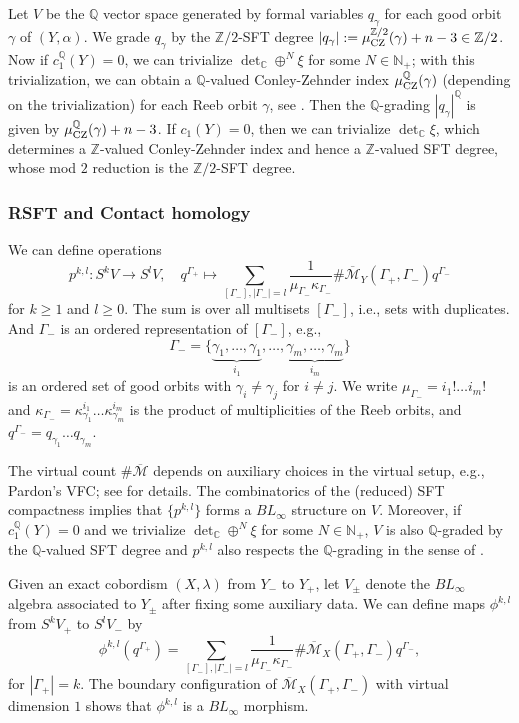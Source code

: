 \documentclass[11pt]{amsart}
\numberwithin{equation}{section}
\def\N{{\mathbb N}}
\def\Z{{\mathbb Z}}
\def\C{{\mathbb C}}
\def\Q{{\mathbb Q}}
\def\cM{{\mathcal M}}
\def\CZ{\rm CZ}
\begin{document}
Let $V$ be the $\Q$ vector space generated by formal variables $q_\gamma$ for each good orbit $\gamma$ of $(Y,\alpha)$. We grade $q_\gamma$ by the $\Z/2$-SFT degree $|q_{\gamma}|:=\mu^{\Z/2}_{\CZ}(\gamma)+n-3\in \Z/2$. Now if $c^{\Q}_1(Y)=0$, we can trivialize $\det_{\C}\oplus^N \xi$ for some $N\in \N_+$; with this trivialization, we can obtain a $\Q$-valued Conley-Zehnder index $\mu^{\Q}_{\CZ}(\gamma)$ (depending on the trivialization) for each Reeb orbit $\gamma$, see \cite[\S 3.3.2]{arXiv:2108.12247}. Then the $\Q$-grading $|q_{\gamma}|^{\Q}$ is given by $\mu^{\Q}_{\CZ}(\gamma)+n-3$. If $c_1(Y)=0$, then we can trivialize $\det_{\C}\xi$, which determines a $\Z$-valued Conley-Zehnder index and hence a $\Z$-valued SFT degree, whose mod $2$ reduction is the $\Z/2$-SFT degree.


\subsubsection{RSFT and Contact homology}
We can define operations 
$$p^{k,l}:S^kV \to S^lV, \quad q^{\Gamma_+} \mapsto \sum_{[\Gamma_-],|\Gamma_-|=l} \frac{1}{\mu_{\Gamma_-}\kappa_{\Gamma_-}}\#\overline{\cM}_Y(\Gamma_+,\Gamma_-)q^{\Gamma_-}$$
for $k\ge 1$ and $l\ge 0$.
The sum is over all multisets $[\Gamma_-]$, i.e., sets with duplicates. And $\Gamma_-$ is an ordered representation of $[\Gamma_-]$, e.g., $$\Gamma_-=\{\underbrace{\gamma_1,\ldots,\gamma_1}_{i_1}, \ldots, \underbrace{\gamma_m,\ldots,\gamma_m}_{i_m}\}$$ is an ordered set of good orbits with $\gamma_i\ne \gamma_j$ for $i\ne j$. We write $\mu_{\Gamma_-}=i_1!\ldots i_m!$ and $\kappa_{\Gamma_-}=\kappa^{i_1}_{\gamma_1}\ldots \kappa^{i_m}_{\gamma_m}$ is the product of multiplicities of the Reeb orbits, and $q^{\Gamma_-}=q_{\gamma_1} \ldots  q_{\gamma_m}$. 

The virtual count $\#\overline{\cM}$ depends on auxiliary choices in the virtual setup, e.g., Pardon's VFC; see \cite[\S 3.6]{moreno2024landscape} for details. The combinatorics of the (reduced) SFT compactness implies that $\{p^{k,l}\}$ forms a $BL_\infty$ structure on $V$. Moreover, if $c_1^{\Q}(Y)=0$ and we trivialize $\det_{\C}\oplus^N \xi$ for some $N\in \N_+$, $V$ is also $\Q$-graded by the $\Q$-valued SFT degree and $p^{k,l}$ also respects the $\Q$-grading in the sense of . 

Given an exact cobordism $(X,\lambda)$ from $Y_-$ to $Y_+$, let $V_{\pm}$ denote the $BL_\infty$ algebra associated to $Y_{\pm}$ after fixing some auxiliary data. We can define maps $\phi^{k,l}$ from $S^kV_+$ to $S^lV_-$ by
$$\phi^{k,l}(q^{\Gamma_+})= \sum_{[\Gamma_-],|\Gamma_-|=l} \frac{1}{\mu_{\Gamma_-}\kappa_{\Gamma_-}} \# \overline{\cM}_{X}(\Gamma_+,\Gamma_-)q^{\Gamma_-},$$
for $|\Gamma_+|=k$.
The boundary configuration of $\overline{\cM}_{X}(\Gamma_+,\Gamma_-)$ with virtual dimension $1$ shows that $\phi^{k,l}$ is a $BL_\infty$ morphism. 
\end{document}
